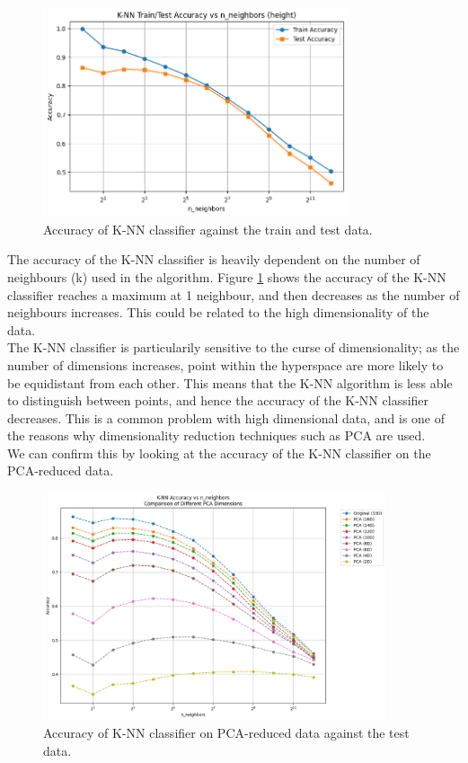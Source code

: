 \documentclass[12pt]{article}
\begin{document}
\begin{figure}[H]
\centering
\includegraphics[width=0.8\textwidth]{figures/knn_accuracy.png}
\caption{Accuracy of K-NN classifier against the train and test data.}
\label{fig:knn_accuracy}
\end{figure}

The accuracy of the K-NN classifier is heavily dependent on the number of neighbours (k) used in the algorithm. Figure \ref{fig:knn_accuracy} shows the accuracy of the K-NN classifier reaches a maximum at 1 neighbour, and then decreases as the number of neighbours increases. This could be related to the high dimensionality of the data.
\\
The K-NN classifier is particularily sensitive to the curse of dimensionality; as the number of dimensions increases, point within the hyperspace are more likely to be equidistant from each other. This means that the K-NN algorithm is less able to distinguish between points, and hence the accuracy of the K-NN classifier decreases. This is a common problem with high dimensional data, and is one of the reasons why dimensionality reduction techniques such as PCA are used.
\\

We can confirm this by looking at the accuracy of the K-NN classifier on the PCA-reduced data. 

\begin{figure}[H]
\centering
\includegraphics[width=0.9\textwidth]{figures/knn_accuracy_pca.png}
\caption{Accuracy of K-NN classifier on PCA-reduced data against the test data.}
\label{fig:knn_accuracy_pca}
\end{figure}
\end{document}
